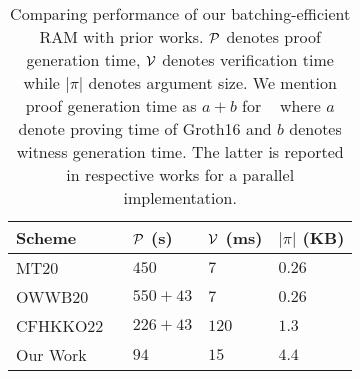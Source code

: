 \begin{table}[htbp]
    \centering
    \begin{tabularx}{0.49\textwidth}{@{}XXXX@{}}
        \toprule
        Scheme & $\mathcal{P}$ (s) & $\mathcal{V}$ (ms) & $|\pi|$ (KB) \\ \midrule
        MT20 & $450$ & $7$  & $0.26$ \\
        OWWB20 ~\cite{USENIX:OWWB20} & $550+43$ & $7$  & $0.26$ \\
        CFHKKO22 ~\cite{CCS:CFHKKO22} & $226+43$ & $120$ & $1.3$ \\
        Our Work & $94$ & $15$ & $4.4$ \\
        \bottomrule
    \end{tabularx}
    \caption{Comparing performance of our batching-efficient RAM with prior works. $\mathcal{P}$
    denotes proof generation time, $\mathcal{V}$ denotes verification time while $|\pi|$ denotes
    argument size. We mention proof generation time as $a+b$ for ~\cite{USENIX:OWWB20,CCS:CFHKKO22}
    where $a$ denote proving time of \textsf{Groth16} and $b$ denotes witness generation time. The latter
    is reported in respective works for a parallel implementation.}
    \label{tbl:performance-comparison}
    \vspace*{-5mm}
\end{table}




